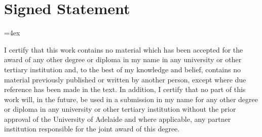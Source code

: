 \chapter{Signed Statement}
{\parindent=0pt\parskip=4ex

%
%
%






%
%
I certify that this work contains no material which has been accepted for the award of any other degree or diploma in my name in any university or other tertiary institution and, to the best of my knowledge and belief, contains no material previously published or written by another person, except where due reference has been made in the text. In addition, I certify that no part of this work will, in the future, be used in a submission in my name for any other degree or diploma in any university or other tertiary institution without the prior approval of the University of Adelaide and where applicable, any partner institution responsible for the joint award of this degree.

}
